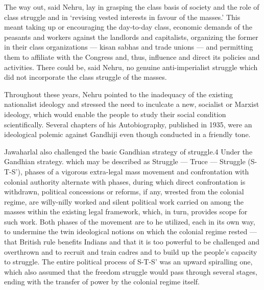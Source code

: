 \begin{multicols}{2}
The way out, said Nehru, lay in grasping the class basis of society and the role of class struggle and in `revising vested interests in favour of the masses.' This meant taking up or encouraging the day-to-day class, economic demands of the peasants and workers against the landlords and capitalists, organizing the former in their class organizations --- kisan sabhas and trade unions --- and permitting them to affiliate with the Congress and, thus, influence and direct its policies and activities. There could be, said Nehru, no genuine anti-imperialist struggle which did not incorporate the class struggle of the masses. 

Throughout these years, Nehru pointed to the inadequacy of the existing nationalist ideology and stressed the need to inculcate a new, socialist or Marxist ideology, which would enable the people to study their social condition scientifically. Several chapters of his Autobiography, published in 1935, were an ideological polemic against Gandhiji even though conducted in a friendly tone. 

Jawaharlal also challenged the basic Gandhian strategy of struggle.4 Under the Gandhian strategy. which may be described as Struggle --- Truce --- Struggle (S-T-S'), phases of a vigorous extra-legal mass movement and confrontation with colonial authority alternate with phases, during which direct confrontation is withdrawn, political concessions or reforms, if any, wrested from the colonial regime, are willy-nilly worked and silent political work carried on among the masses within the existing legal framework, which, in turn, provides scope for such work. Both phases of the movement are to he utilized, each in its own way, to undermine the twin ideological notions on which the colonial regime rested --- that British rule benefits Indians and that it is too powerful to be challenged and overthrown and to recruit and train cadres and to build up the people's capacity to struggle. The entire political process of S-T-S' was an upward spiralling one, which also assumed that the freedom struggle would pass through several stages, ending with the transfer of power by the colonial regime itself. 


\end{multicols}
